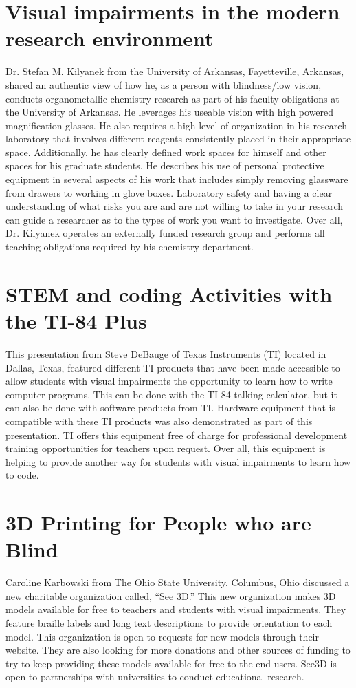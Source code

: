\documentclass[11.5pt]{sig-alternate} %
\begin{document}
\begin{large}
\section*{Visual impairments in the modern research environment}
Dr. Stefan M. Kilyanek from the University of Arkansas, Fayetteville, Arkansas, shared an authentic view of how he, as a person with blindness/low vision, conducts organometallic chemistry research as part of his faculty obligations at the University of Arkansas. He leverages his useable vision with high powered magnification glasses. He also requires a high level of organization in his research laboratory that involves different reagents consistently placed in their appropriate space. Additionally, he has clearly defined work spaces for himself and other spaces for his graduate students. He describes his use of personal protective equipment in several aspects of his work that includes simply removing glassware from drawers to working in glove boxes. Laboratory safety and having a clear understanding of what risks you are and are not willing to take in your research can guide a researcher as to the types of work you want to investigate. Over all, Dr. Kilyanek operates an externally funded research group and performs all teaching obligations required by his chemistry department.


\section*{STEM and coding Activities with the TI-84 Plus}
This presentation from Steve DeBauge of Texas Instruments (TI) located in Dallas, Texas, featured different TI products that have been made accessible to allow students with visual impairments the opportunity to learn how to write computer programs. This can be done with the TI-84 talking calculator, but it can also be done with software products from TI. Hardware equipment that is compatible with these TI products was also demonstrated as part of this presentation. TI offers this equipment free of charge for professional development training opportunities for teachers upon request. Over all, this equipment is helping to provide another way for students with visual impairments to learn how to code.


\section*{3D Printing for People who are Blind}
Caroline Karbowski from The Ohio State University, Columbus, Ohio discussed a new charitable organization called, “See 3D.” This new organization makes 3D models available for free to teachers and students with visual impairments. They feature braille labels and long text descriptions to provide orientation to each model. This organization is open to requests for new models through their website. They are also looking for more donations and other sources of funding to try to keep providing these models available for free to the end users. See3D is open to partnerships with universities to conduct educational research. 



\end{large}
\end{document}
